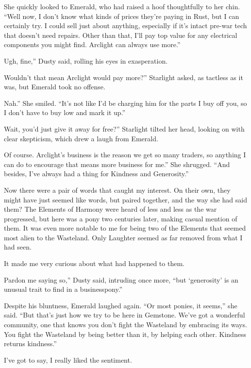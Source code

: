 She quickly looked to Emerald, who had raised a hoof thoughtfully to her chin. “Well now, I don’t know what kinds of prices they’re paying in Rust, but I can certainly try. I could sell just about anything, especially if it’s intact pre-war tech that doesn’t need repairs. Other than that, I’ll pay top value for any electrical components you might find. Arclight can always use more.”

\leavevmode{}Ugh, fine,” Dusty said, rolling his eyes in exasperation.

\leavevmode{}Wouldn’t that mean Arclight would pay more?” Starlight asked, as tactless as it was, but Emerald took no offense.

\leavevmode{}Nah.” She smiled. “It’s not like I’d be charging him for the parts I buy off you, so I don’t have to buy low and mark it up.”

\leavevmode{}Wait, you’d just give it away for free?” Starlight tilted her head, looking on with clear skepticism, which drew a laugh from Emerald.

\leavevmode{}Of course. Arclight’s business is the reason we get so many traders, so anything I can do to encourage that means more business for me.” She shrugged. “And besides, I’ve always had a thing for Kindness and Generosity.”

Now there were a pair of words that caught my interest. On their own, they might have just seemed like words, but paired together, and the way she had said them? The Elements of Harmony were heard of less and less as the war progressed, but here was a pony two centuries later, making casual mention of them. It was even more notable to me for being two of the Elements that seemed most alien to the Wasteland. Only Laughter seemed as far removed from what I had seen.

It made me very curious about what had happened to them.

\leavevmode{}Pardon me saying so,” Dusty said, intruding once more, “but ‘generosity’ is an unusual trait to find in a businesspony.”

Despite his bluntness, Emerald laughed again. “Or most ponies, it seems,” she said. “But that’s just how we try to be here in Gemstone. We’ve got a wonderful community, one that knows you don’t fight the Wasteland by embracing its ways. You fight the Wasteland by being better than it, by helping each other. Kindness returns kindness.”

I’ve got to say, I really liked the sentiment.

